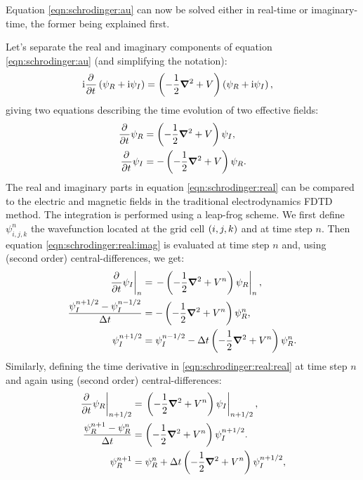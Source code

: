 Equation \eqref{eqn:schrodinger:au} can now be solved either in real-time or
imaginary-time, the former being explained first.

Let's separate the real and imaginary components of equation
\eqref{eqn:schrodinger:au} (and simplifying the notation):
\begin{align}
\textrm{i} \frac{\partial^{{}}   }{\partial t^{{}}} \left(  \psi_R + \textrm{i} \psi_I \right)
    & = \left( -\frac{1}{2} \bm{\nabla}^2 + V  \right)
        \left(  \psi_R + \textrm{i} \psi_I \right),
\end{align}
giving two equations describing the time evolution of two effective fields:
\begin{subequations}
\begin{align}
\frac{\partial^{{}}   }{\partial t^{{}}} \psi_R & =   \left( -\frac{1}{2} \bm{\nabla}^2 + V  \right) \psi_I,
\label{eqn:schrodinger:real:real} \\
\frac{\partial^{{}}   }{\partial t^{{}}} \psi_I & = - \left( -\frac{1}{2} \bm{\nabla}^2 + V  \right) \psi_R.
\label{eqn:schrodinger:real:imag}
\end{align}
\label{eqn:schrodinger:real}
\end{subequations}
The real and imaginary parts in equation \eqref{eqn:schrodinger:real} can be
compared to the electric and magnetic fields in the traditional electrodynamics
FDTD method. The integration is performed using a leap-frog scheme. We
first define $\psi_{i,j,k}^{n}$ the wavefunction located at the grid cell
$\left( i,j,k \right)$ and at time step $n$. Then equation
\eqref{eqn:schrodinger:real:imag} is evaluated at time step $n$ and, using
(second order) central-differences, we get:
\begin{align}
\left. \frac{\partial^{{}}   }{\partial t^{{}}} \psi_I \right|_{n}
& = \left. - \left( -\frac{1}{2} \bm{\nabla}^2 + V^{n}  \right) \psi_R \right|_{n}, \\
\frac{\psi_{I}^{n+1/2} - \psi_{I}^{n-1/2}}{\Delta t}
& = - \left( -\frac{1}{2} \bm{\nabla}^2 + V^{n}  \right) \psi_{R}^{n}, \\
\psi_{I}^{n+1/2}
& = \psi_{I}^{n-1/2} - \Delta t \left( -\frac{1}{2} \bm{\nabla}^2 + V^{n}  \right)
\psi_{R}^{n}.
\label{eqn:schrodinger:real:imag:discretized}
\end{align}
Similarly, defining the time derivative in \eqref{eqn:schrodinger:real:real} at
time step $n$ and again using (second order) central-differences:
\begin{align}
\left. \frac{\partial^{{}}   }{\partial t^{{}}} \psi_R \right|_{n+1/2}
& = \left. \left( -\frac{1}{2} \bm{\nabla}^2 + V^{n}  \right) \psi_I \right|_{n+1/2}, \\
\frac{\psi_{R}^{n+1} - \psi_{R}^{n}}{\Delta t}
& = \left( -\frac{1}{2} \bm{\nabla}^2 + V^{n}  \right) \psi_{I}^{n+1/2}. \\
\psi_{R}^{n+1}
& = \psi_{R}^{n} + \Delta t \left( -\frac{1}{2} \bm{\nabla}^2 + V^{n}  \right)
\psi_{I}^{n+1/2},
\label{eqn:schrodinger:real:real:discretized}
\end{align}


